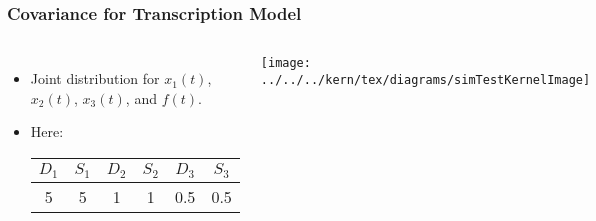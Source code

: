 \begin{frame}[labels=skipGPProperties]
  \frametitle{Covariance for Transcription Model}
  \begin{columns}[c]
    \column{4cm}
    \begin{itemize}
    \item Joint distribution for $x_{1}\left(t\right)$, $x_{2}\left(t\right)$, $x_{3}\left(t\right)$,
      and $f\left(t\right)$.

    \item Here:\vspace{0.1cm}
      {\tiny 
        \begin{tabular}{|c|c|c|c|c|c|}
          \hline 
          $D_{1}$ & $S_{1}$ & $D_{2}$ & $S_{2}$ & $D_3$ &  $S_3$\\
          \hline
          \hline 
          5 & 5& 1 & 1& 0.5 & 0.5\\
          \hline
        \end{tabular}
      }
    \end{itemize}

    \column{6cm}

    \begin{center}
      \texttt{[image: ../../../kern/tex/diagrams/simTestKernelImage]}
    \end{center}
  \end{columns}
\end{frame}

